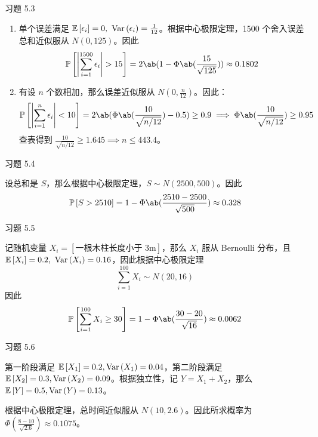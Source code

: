 \begin{problem}
    习题 5.3
    \begin{solution}
        \begin{enumerate}
            \item[\textbf{1)}] 单个误差满足 $\expect{\epsilon_i} = 0,\ \variance{\epsilon_i} = \frac{1}{12}$。根据中心极限定理，1500 个舍入误差总和近似服从 $N(0, 125)$。因此
            $$
            \prob{\abs{\sum_{i = 1}^{1500} \epsilon_i} > 15} = 2 \ab(1 - \Phi\ab(\frac{15}{\sqrt{125}})) \approx 0.1802
            $$
            \item[\textbf{2)}] 有设 $n$ 个数相加，那么误差近似服从 $N(0, \frac{n}{12})$。因此：
            $$
            \prob{\abs{\sum_{i = 1}^{n} \epsilon_i} < 10} = 2 \ab(\Phi\ab(\frac{10}{\sqrt{n / 12}}) - 0.5) \ge 0.9 \implies \Phi\ab(\frac{10}{\sqrt{n / 12}}) \ge 0.95
            $$
            查表得到 $\frac{10}{\sqrt{n / 12}} \ge 1.645 \implies n \le 443.4$。
        \end{enumerate}
    \end{solution}
\end{problem}

\begin{problem}
    习题 5.4
    \begin{solution}
        设总和是 $S$，那么根据中心极限定理，$S \sim N(2500, 500)$。因此
        $$
        \prob{S > 2510} = 1 - \Phi\ab(\frac{2510 - 2500}{\sqrt{500}}) \approx 0.328
        $$
    \end{solution}
\end{problem}

\begin{problem}
    习题 5.5
    \begin{solution}
        记随机变量 $X_i = [\text{一根木柱长度小于 3m}]$，那么 $X_i$ 服从 Bernoulli 分布，且 $\expect{X_i} = 0.2,\ \variance{X_i} = 0.16$，因此根据中心极限定理
        $$
        \sum_{i = 1}^{100} X_i \sim N(20, 16)
        $$
        因此
        $$
        \prob{\sum_{i = 1}^{100} X_i \ge 30} = 1 - \Phi\ab(\frac{30 - 20}{\sqrt{16}}) \approx 0.0062
        $$
    \end{solution}
\end{problem}

\begin{problem}
    习题 5.6
    \begin{solution}
        第一阶段满足 $\operatorname{\mathbb{E}}\left[X_1\right] = 0.2, \operatorname{Var}\left(X_1\right) = 0.04$，第二阶段满足 $\operatorname{\mathbb{E}}\left[X_2\right] = 0.3, \operatorname{Var}\left(X_2\right) = 0.09$。根据独立性，记 $Y = X_1 + X_2$，那么 $\operatorname{\mathbb{E}}\left[Y\right] = 0.5, \operatorname{Var}\left(Y\right) = 0.13$。

        根据中心极限定理，总时间近似服从 $N(10, 2.6)$。因此所求概率为 $\Phi(\frac{8 - 10}{\sqrt{2.6}}) \approx 0.1075$。
    \end{solution}
\end{problem}

